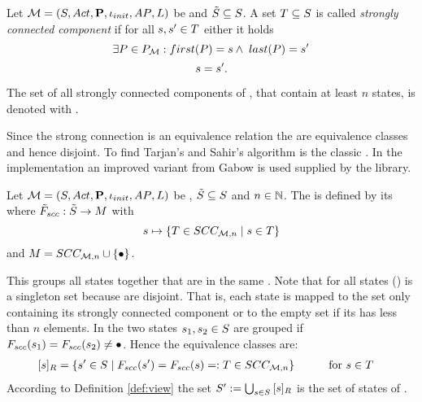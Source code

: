 \documentclass[preview]{standalone}
\begin{document}
\begin{definition}
	Let ${{{\mathcal{M}}}} = {{({S}, {Act}, {\textbf{P}}, {\iota_{init}}, {AP}, {L})}}$ be \achgphN and ${\tilde{{S}}} \subseteq {S}$. A set ${T} \subseteq {S}$ is called \emph{strongly connected component} if for all ${s}, {s}' \in {T}$ either it holds
	\[
		\exists \path \in \pathset : \pfirst(\path) = \state \land \; \plast(\path) = \state'
	\]
	{}
	\[
	 {s} = {s}'\text{.}
	\]
	
	\noindent
	The set of all strongly connected components of \chgph, that contain at least $n$ states, is denoted with \setscc.
\end{definition}

Since the strong connection is an equivalence relation the \sccsN are equivalence classes and hence disjoint. To find \sccsN Tarjan's and Sahir's algorithm is the classic \cite{Sharir1981}. In the implementation an improved variant from Gabow \cite{Gabow2000} is used supplied by the \jgrapht library.

\begin{definition}
	Let ${{{\mathcal{M}}}} = {{({S}, {Act}, {\textbf{P}}, {\iota_{init}}, {AP}, {L})}}$ be \achgphN, ${\tilde{{S}}} \subseteq {S}$ and $n \in {\mathbb{N}}$. The \viewN \viewscc is defined by its \grpfctN \gfctscc where ${{\tilde{F}_{{scc}}}} : {\tilde{{S}}} \to {\ensuremath{{M}}}$ with
	\[
	{s} \mapsto \{{T} \in {SCC_{\ensuremath{{{{\mathcal{M}}}}},n}} \mid {s} \in {T}\}
	\]
	and $\imggrp = \setscc \cup \remset$.
\end{definition}

This \viewN groups all states together that are in the same \sccN. Note that for all states \state \gfctscc(\state) is a singleton set because \sccsN are disjoint. That is, each state is mapped to the set only containing its strongly connected component or to the empty set if its \sccN has less than $n$ elements. In the \viewN \viewscc two states ${s}_1, {s}_2 \in {S}$ are grouped if ${{F_{{scc}}}}({s}_1) = {{F_{{scc}}}}({s}_2) \neq {\bullet}$. Hence the equivalence classes are:
\begin{align*}
	{\ensuremath{{[{s}]_{{R}}}}} &= \{{s}' \in {S} \mid {\ensuremath{{F_{{scc}}}}}({s}') = {{F_{{scc}}}}({s}) =: {T} \in {SCC_{\ensuremath{{{{\mathcal{M}}}}},n}}\} \quad\quad\quad \text{for } {s} \in {T}
\end{align*}
According to Definition \ref{def:view} the set ${S}' := \bigcup_{{s} \in {S}} {{[{s}]_{{R}}}}$ is the set of states of \viewexactcycle.
\end{document}
